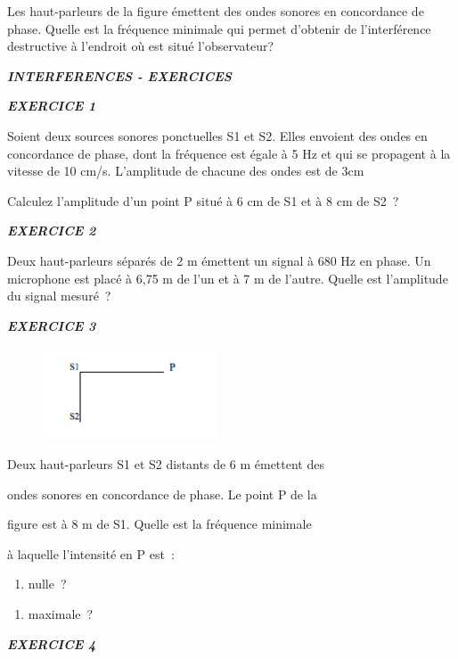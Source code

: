 {Les haut-parleurs de la figure émettent des ondes sonores en concordance
de phase. Quelle est la fréquence minimale qui permet d'obtenir de
l'interférence destructive à l'endroit où est situé l'observateur?

\emph{\textbf{INTERFERENCES - EXERCICES}}

\emph{\textbf{EXERCICE 1}}

Soient deux sources sonores ponctuelles S1 et S2. Elles envoient des
ondes en concordance de phase, dont la fréquence est égale à 5 Hz et qui
se propagent à la vitesse de 10 cm/s. L'amplitude de chacune des ondes
est de 3cm

Calculez l'amplitude d'un point P situé à 6 cm de S1 et à 8 cm de S2~?

\emph{\textbf{EXERCICE 2}}

Deux haut-parleurs séparés de 2 m émettent un signal à 680 Hz en phase.
Un microphone est placé à 6,75 m de l'un et à 7 m de l'autre. Quelle est
l'amplitude du signal mesuré~?

\emph{\textbf{EXERCICE 3}}

\begin{figure}
\centering
\includegraphics[width=5.151cm,height=2.729cm]{Pictures/10000001000000BC000000630AF71C86AA2A0A65.png}
\caption{}
\end{figure}

Deux haut-parleurs S1 et S2 distants de 6 m émettent des

ondes sonores en concordance de phase. Le point P de la

figure est à 8 m de S1. Quelle est la fréquence minimale

à laquelle l'intensité en P est~:

\begin{enumerate}
\def\labelenumi{\alph{enumi})}
\tightlist
\item
  nulle~?
\end{enumerate}

\begin{enumerate}
\def\labelenumi{\alph{enumi})}
\tightlist
\item
  maximale~?
\end{enumerate}

\emph{\textbf{EXERCICE 4}}

}
